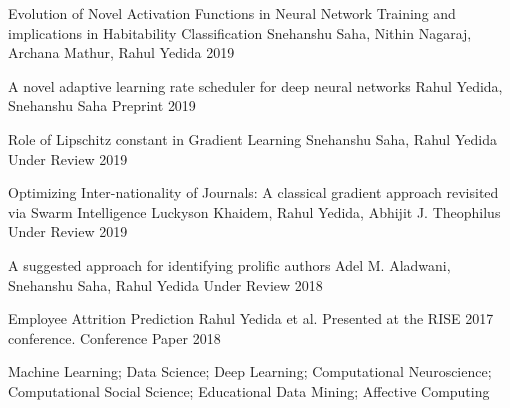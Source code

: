 


\begin{cvhonors}

  \cvhonor
    {Evolution of Novel Activation Functions in Neural Network Training and implications in Habitability Classification
}
    {Snehanshu Saha, Nithin Nagaraj, Archana Mathur, Rahul Yedida}
    {} %
    {2019} %

  \cvhonor
    {A novel adaptive learning rate scheduler for deep neural networks}
    {Rahul Yedida, Snehanshu Saha}
    {Preprint} %
    {2019} %

  \cvhonor
    {Role of Lipschitz constant in Gradient Learning}
    {Snehanshu Saha, Rahul Yedida}
    {Under Review} %
    {2019} %

  \cvhonor
    {Optimizing Inter-nationality of Journals: A classical gradient approach revisited via Swarm Intelligence}
    {Luckyson Khaidem, Rahul Yedida, Abhijit J. Theophilus}
    {Under Review} %
    {2019} %
    
  \cvhonor
    {A suggested approach for identifying prolific authors}
    {Adel M. Aladwani, Snehanshu Saha, Rahul Yedida}
    {Under Review} %
    {2018} %

  \cvhonor
    {Employee Attrition Prediction}
    {Rahul Yedida et al. Presented at the RISE 2017 conference.}
    {Conference Paper}
    {2018}

\end{cvhonors}


Machine Learning; Data Science; Deep Learning; Computational Neuroscience; Computational Social Science; Educational Data Mining; Affective Computing \\ \\